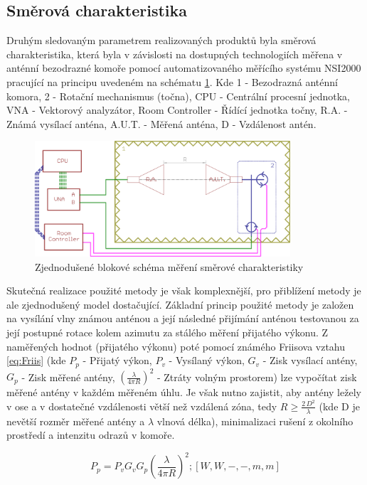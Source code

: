 \subsection{Směrová charakteristika}
Druhým sledovaným parametrem realizovaných produktů byla směrová charakteristika, která byla v závislosti na dostupných technologiích měřena v anténní bezodrazné komoře pomocí automatizovaného měřícího systému NSI2000 pracující na principu uvedeném na schématu \ref{fig:DirectDia}. Kde 1 - Bezodrazná anténní komora, 2 - Rotační mechanismus (točna), CPU - Centrální procesní jednotka, VNA - Vektorový analyzátor, Room Controller - Řídící jednotka točny, R.A. - Známá vysílací anténa, A.U.T. - Měřená anténa, D - Vzdálenost antén.

\begin{figure}[!htbp]
\begin{center}
\includegraphics[width=9.5cm]{pics/DirectDia}
\caption{Zjednodušené blokové schéma měření směrové charakteristiky}
\label{fig:DirectDia}
\end{center}
\end{figure}

Skutečná realizace použité metody je však komplexnější, pro přiblížení metody je ale zjednodušený model dostačující.
Základní princip použité metody je založen na vysílání vlny známou anténou a její následné přijímání anténou testovanou za její postupné rotace kolem azimutu za stálého měření přijatého výkonu. Z naměřených hodnot (přijatého výkonu) poté pomocí známého Friisova vztahu \ref{eq:Friis} (kde $P_p$ - Přijatý výkon, $P_v$ - Vysílaný výkon, $G_v$ - Zisk vysílací antény, $G_p$ - Zisk měřené antény, $( \frac{\lambda}{4 \pi R} )^2$ - Ztráty volným prostorem) lze vypočítat zisk měřené antény v každém měřeném úhlu. Je však nutno zajistit, aby antény ležely v ose a v dostatečné vzdálenosti větší než vzdálená zóna, tedy $R \geq \frac{2\,D^2}{\lambda}$ (kde D je nevětší rozměr měřené antény a $\lambda$ vlnová délka), minimalizaci rušení z okolního prostředí a intenzitu odrazů v komoře.

\begin{equation}
P_p = P_v G_v G_p( \frac{\lambda}{4 \pi R} )^2 ; [W, W, -, -, m, m]
\label{eq:Friis}
\end{equation}


